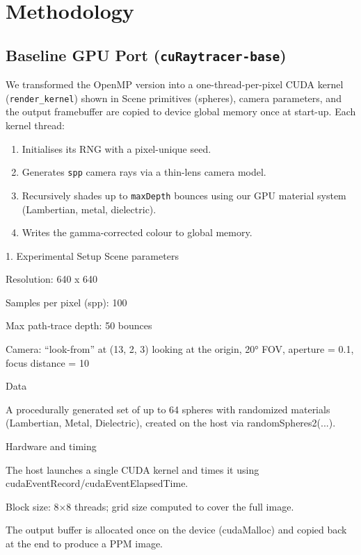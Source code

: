 \section{Methodology}

\subsection{Baseline GPU Port (\texttt{cuRaytracer-base})}
We transformed the OpenMP version into a one-thread-per-pixel CUDA
kernel (\texttt{render\_kernel}) shown in
  Scene primitives (spheres), camera
parameters, and the output framebuffer are copied to device global
memory once at start-up.  Each kernel thread:

\begin{enumerate}
  \item Initialises its RNG with a pixel-unique seed.
  \item Generates \texttt{spp} camera rays via a thin-lens camera model.
  \item Recursively shades up to \texttt{maxDepth} bounces using
        our GPU material system (Lambertian, metal, dielectric).
  \item Writes the gamma-corrected colour to global memory.
\end{enumerate}

1. Experimental Setup
Scene parameters

Resolution: 640 x 640

Samples per pixel (spp): 100

Max path‐trace depth: 50 bounces

Camera: “look-from” at (13, 2, 3) looking at the origin, 20° FOV, aperture = 0.1, focus distance = 10

Data

A procedurally generated set of up to 64 spheres with randomized materials (Lambertian, Metal, Dielectric), created on the host via randomSpheres2(...).

Hardware and timing

The host launches a single CUDA kernel and times it using cudaEventRecord/cudaEventElapsedTime.

Block size: 8×8 threads; grid size computed to cover the full image.

The output buffer is allocated once on the device (cudaMalloc) and copied back at the end to produce a PPM image.

